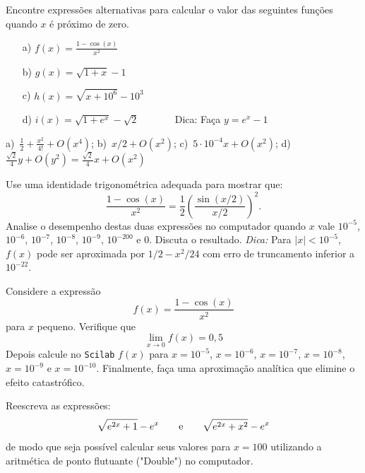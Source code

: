 \documentclass[main.tex]{subfiles}
\begin{document}
\begin{Exercise} Encontre expressões alternativas para calcular o valor das seguintes funções quando $x$ é próximo de zero.
\begin{itemize}
\item[a)] $f(x)=\frac{1-\cos(x)}{x^2}$
\item[b)] $g(x)=\sqrt{1+x}-1$
\item[c)] $h(x)=\sqrt{x+10^6}-10^3$
\item[d)] $i(x)=\sqrt{1+e^{x}}-\sqrt{2}$ ~~~~~~ Dica: Faça $y=e^{x}-1$
\end{itemize}
\end{Exercise}
\begin{Answer}
  \begin{tiny}
    a)~$\frac{1}{2}+\frac{x^2}{4!}+O(x^4)$; b)~$x/2+O(x^2)$; c)~$5\cdot 10^{-4}x+O(x^2)$; d)~$\frac{\sqrt{2}}{4}y+O(y^{2})=\frac{\sqrt{2}}{4}x+O(x^2)$
  \end{tiny}
\end{Answer}

\begin{Exercise} Use uma identidade trigonométrica adequada para mostrar que:
  \begin{equation*}
    \frac{1-\cos(x)}{x^2}= \frac{1}{2} \left(\frac{\sin(x/2)}{x/2}\right)^2.
  \end{equation*}
Analise o desempenho destas duas expressões no computador quando $x$ vale $10^{-5}$, $10^{-6}$, $10^{-7}$, $10^{-8}$, $10^{-9}$, $10^{-200}$ e $0$. Discuta o resultado.
\emph{Dica:} Para $|x|<10^{-5}$, $f(x)$ pode ser aproximada por $1/2-x^2/24$ com erro de truncamento inferior a $10^{-22}$.
\end{Exercise}

\begin{Exercise} Considere a expressão
$$
f(x)=\frac{1-\cos(x)}{x^2}
$$
para $x$ pequeno. Verifique que
$$
\lim_{x\to 0}f(x)=0,5
$$
Depois calcule no \verb+Scilab+ $f(x)$ para $x=10^{-5}$, $x=10^{-6}$, $x=10^{-7}$, $x=10^{-8}$, $x=10^{-9}$ e $x=10^{-10}$. Finalmente, faça uma aproximação analítica que elimine o efeito catastrófico.
\end{Exercise}

\begin{Exercise}[title=Notas do prof. Guidi] Reescreva as expressões:
  $$\sqrt{e^{2x}+1}-e^x \qquad\hbox{e}\qquad \sqrt{e^{2x}+x^2}-e^x $$
  de modo que seja possível calcular seus valores para $x=100$ utilizando a aritmética de ponto flutuante ("Double") no computador.
\end{Exercise}
\end{document}
